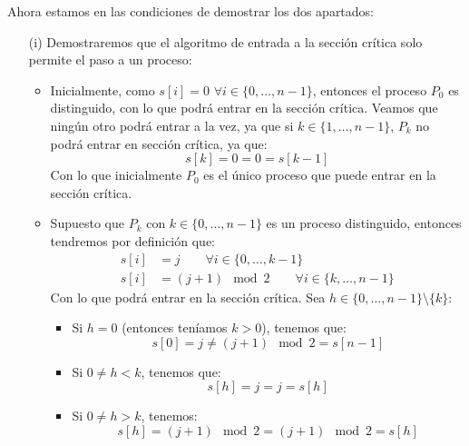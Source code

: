 \begin{ejercicio}
    Ahora estamos en las condiciones de demostrar los dos apartados:
    \begin{enumerate}
        \item[(i)] Demostraremos que el algoritmo de entrada a la sección crítica solo permite el paso a un proceso:
            \begin{itemize}
                \item Inicialmente, como $s[i] = 0$ $\forall i \in \{0,\ldots,n-1\}$, entonces el proceso $P_0$ es distinguido, con lo que podrá entrar en la sección crítica. Veamos que ningún otro podrá entrar a la vez, ya que si $k \in \{1,\ldots,n-1\}$, $P_k$ no podrá entrar en sección crítica, ya que:
                    \begin{equation*}
                        s[k] = 0 = 0 = s[k-1]
                    \end{equation*}
                    Con lo que inicialmente $P_0$ es el único proceso que puede entrar en la sección crítica.
                \item Supuesto que $P_k$ con $k \in \{0,\ldots,n-1\}$ es un proceso distinguido, entonces tendremos por definición que:
                \begin{align*}
                    s[i] &= j \qquad \forall i \in \{0,\ldots, k-1\} \\
                    s[i] &= (j+1) \mod 2 \qquad \forall i \in \{k,\ldots,n-1\}
                \end{align*}
                Con lo que podrá entrar en la sección crítica. Sea $h \in \{0,\ldots,n-1\}\setminus \{k\}$:
                \begin{itemize}
                    \item Si $h=0$ (entonces teníamos $k> 0$), tenemos que:
                        \begin{equation*}
                            s[0] = j \neq (j+1) \mod 2 = s[n-1]
                        \end{equation*}
                    \item Si $0\neq h<k$, tenemos que:
                        \begin{equation*}
                            s[h] = j = j = s[h]
                        \end{equation*}
                    \item Si $0\neq h>k$, tenemos:
                        \begin{equation*}
                            s[h] = (j+1)\mod 2 = (j+1)\mod 2 = s[h]
                        \end{equation*}

\end{itemize}
\end{itemize}
\end{enumerate}
\end{ejercicio}

